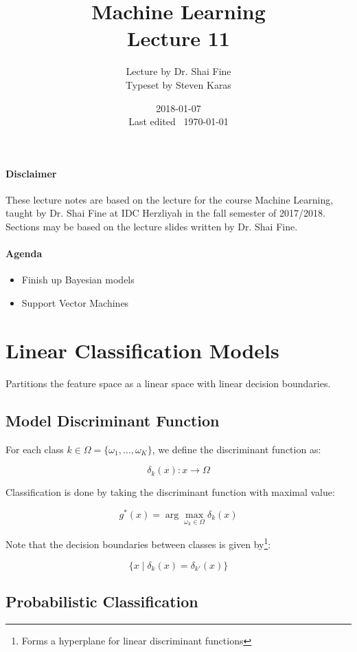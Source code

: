 \documentclass{idc_msc}
\title{Machine Learning\\\large Lecture 11}
\date{2018-01-07 \\ Last edited \currenttime\ \today}
\author{Lecture by Dr. Shai Fine\\Typeset by Steven Karas}
\begin{document}
\maketitle

\paragraph{Disclaimer}

These lecture notes are based on the lecture for the course Machine Learning, taught by Dr. Shai Fine at IDC Herzliyah in the fall semester of 2017/2018.
Sections may be based on the lecture slides written by Dr. Shai Fine.

\paragraph{Agenda}

\begin{itemize}
  \item Finish up Bayesian models
  \item Support Vector Machines
\end{itemize}

\section{Linear Classification Models}

Partitions the feature space as a linear space with linear decision boundaries.

\subsection{Model Discriminant Function}

For each class \(k \in \Omega = \{\omega_1, \ldots, \omega_K\}\), we define the discriminant function as:

\[\delta_k(x) : x \to \Omega\]

Classification is done by taking the discriminant function with maximal value:

\[g^*(x) = \arg\max_{\omega_k \in \Omega} \delta_k(x)\]

Note that the decision boundaries between classes is given by\footnote{Forms a hyperplane for linear discriminant functions}:

\[\{x \mid \delta_k(x) = \delta_{k'}(x)\}\]

\subsection{Probabilistic Classification}
\end{document}

